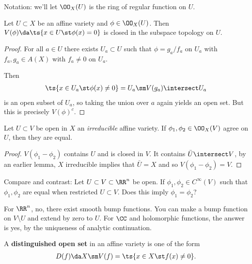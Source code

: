 Notation: we'll let \(\OO_X(U)\) is the ring of regular function on
\(U\).

\begin{proposition}[?]

Let \(U\subset X\) be an affine variety and \(\phi \in \OO_X(U)\). Then
\(V(\phi) \da \ts{x\in U \st \phi(x) = 0}\) is closed in the subspace
topology on \(U\).

\end{proposition}

\begin{proof}

For all \(a\in U\) there exists \(U_a\subset U\) such that
\(\phi = g_a/f_a\) on \(U_a\) with \(f_a, g_a \in A(X)\) with
\(f_a \neq 0\) on \(U_a\).

Then
\begin{align*}  
\ts{x\in U_a \st \phi(x) \neq 0} = U_a \sm V(g_a)\intersect U_a
\end{align*} is an open subset of \(U_a\), so taking the union over
\(a\) again yields an open set. But this is precisely \(V(\phi)^c\).

\end{proof}

\begin{proposition}

Let \(U\subset V\) be open in \(X\) an \emph{irreducible} affine
variety. If \(\phi_1, \phi_2 \in \OO_X(V)\) agree on \(U\), then they
are equal.

\end{proposition}

\begin{proof}

\(V(\phi_1 - \phi_2)\) contains \(U\) and is closed in \(V\). It
contains \(\bar U\intersect V\), by an earlier lemma, \(X\) irreducible
implies that \(\bar U = X\) and so \(V(\phi_1 - \phi_2) =V\).

\end{proof}

Compare and contrast: Let \(U\subset V \subset \RR^n\) be open. If
\(\phi_1, \phi_2 \in C^\infty(V)\) such that \(\phi_1, \phi_2\) are
equal when restricted \(U\subset V\). Does this imply
\(\phi_1 = \phi_2\)?

For \(\RR^n\), no, there exist smooth bump functions. You can make a
bump function on \(V\setminus U\) and extend by zero to \(U\). For
\(\CC\) and holomorphic functions, the answer is yes, by the uniqueness
of analytic continuation.

\begin{definition}

A \textbf{distinguished open set} in an affine variety is one of the
form
\begin{align*}  
D(f) \da X\sm V(f) = \ts{x\in X \st f(x) \neq 0}
.\end{align*}

\end{definition}

